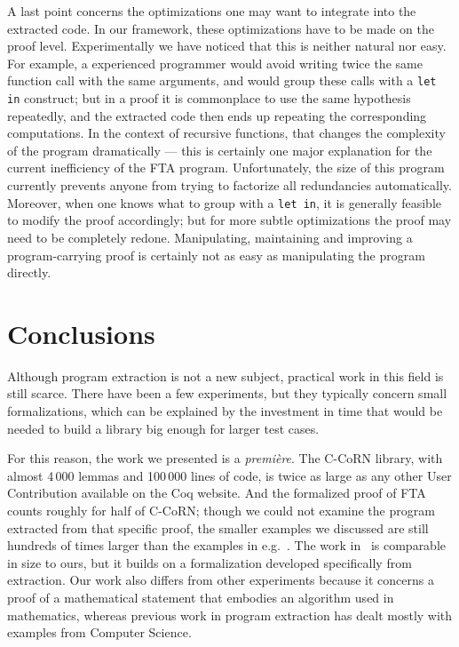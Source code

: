 \documentclass{entcs}
\begin{document}
A last point concerns the optimizations one may want to integrate into
the extracted code. In our framework, these optimizations
have to be made on the proof level. Experimentally we have noticed
that this is neither natural nor easy. For example, a experienced
programmer would avoid writing twice the same function call with the
same arguments, and would group these calls with a \texttt{let in}
construct; but in a proof it is commonplace to use the same
hypothesis repeatedly, and the extracted code then ends up repeating
the corresponding
computations.  In the context of recursive functions, that changes
the complexity of the program dramatically --- this is certainly one
major explanation for the current inefficiency of the FTA program.
Unfortunately, the size of this program currently prevents anyone from
trying to factorize all redundancies automatically.  Moreover, when
one knows what to group with a \texttt{let in}, it is generally feasible to
modify the proof accordingly; but for more subtle optimizations the
proof may need to be completely redone. Manipulating, maintaining and
improving a program-carrying proof is certainly not as easy as
manipulating the program directly.


\section{Conclusions}

Although program extraction is not a new subject, practical work in this
field is still scarce.  There have been a few experiments, but they
typically concern small formalizations, which can be explained
by the investment in time that would be needed to build a library big
enough for larger test cases.

For this reason, the work we presented is a \emph{premi{\`e}re}. The C-CoRN 
library, with almost 4\,000 lemmas and 100\,000 lines of code, is twice 
as large as any other User Contribution available on the Coq website.  
And the formalized proof of FTA counts roughly for half of C-CoRN;
though we could not
examine the program extracted from that specific proof, the
smaller examples we discussed are still hundreds of times larger than the
examples in e.g.~\cite{nogin00}.
The work in~\cite{thery:98} is comparable in size to ours, but it builds on
a formalization developed specifically from extraction.
Our work also differs from other experiments
because it concerns a proof of a mathematical statement that embodies
an algorithm used in mathematics, whereas previous work in program
extraction has dealt mostly with examples from Computer Science.
\end{document}
